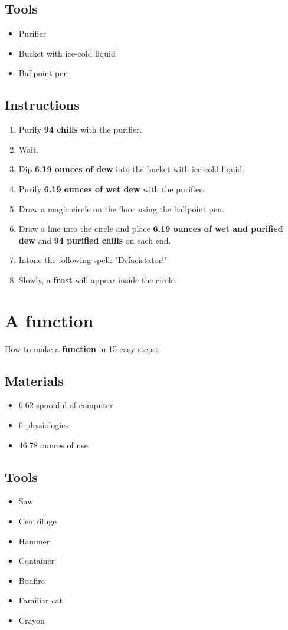 \documentclass{article}
\begin{document}
\subsection{Tools}\begin{itemize}
\item 
Purifier
\item 
Bucket with ice-cold liquid
\item 
Ballpoint pen
\end{itemize}
\subsection{Instructions}\begin{enumerate}
\item 
Purify \textbf{94 chills} with the purifier.
\item 
Wait.
\item 
Dip \textbf{6.19 ounces of dew} into the bucket with ice-cold liquid.
\item 
Purify \textbf{6.19 ounces of wet dew} with the purifier.
\item 
Draw a magic circle on the floor using the ballpoint pen.
\item 
Draw a line into the circle and place \textbf{6.19 ounces of wet and purified dew} and \textbf{94 purified chills} on each end.
\item 
Intone the following spell: "Defacistator!"
\item 
Slowly, a \textbf{frost} will appear inside the circle.
\end{enumerate}
\newpage
\section{A function}How to make a \textbf{function} in 15 easy steps:

\subsection{Materials}\begin{itemize}
\item 
6.62 spoonful of computer
\item 
6 physiologies
\item 
46.78 ounces of use
\end{itemize}
\subsection{Tools}\begin{itemize}
\item 
Saw
\item 
Centrifuge
\item 
Hammer
\item 
Container
\item 
Bonfire
\item 
Familiar cat
\item 
Crayon
\end{itemize}
\end{document}
